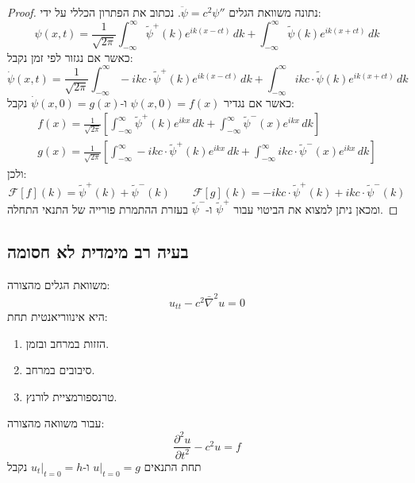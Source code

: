 \documentclass{tstextbook}
\begin{document}
\begin{proof}
נתונה משוואת הגלים \(\ddot{\psi}=c^{2}\psi''\). נכתוב את הפתרון הכללי על ידי:
$$\psi(x,t)=\frac{1}{\sqrt{ 2\pi }} \int_{-\infty}^{\infty} \tilde{\psi}^{+}(k) e^{ ik(x-ct) } \, dk + \int_{-\infty}^{\infty} \tilde{\psi}(k) e^{ ik(x+ct) }\, dk  $$
כאשר אם נגזור לפי זמן נקבל:
$$\dot{\psi}(x,t)=\frac{1}{\sqrt{ 2\pi }} \int_{-\infty}^{\infty} -ikc \cdot\tilde{\psi}^{+}(k) e^{ ik(x-ct) } \, dk + \int_{-\infty}^{\infty} ikc\cdot\tilde{\psi}(k) e^{ ik(x+ct) }\, dk  $$
כאשר אם נגדיר \(\psi(x,0)=f(x)\) ו-\(\dot{\psi}(x,0)=g(x)\) נקבל:
$$\begin{gather}f(x)=\frac{1}{\sqrt{ 2\pi }}\left[ \int_{-\infty}^{\infty} \tilde{\psi}^{+}(k)e^{ ikx } \, dk + \int_{-\infty}^{\infty} \tilde{\psi}^{-}(x)e^{ ikx } \, dk  \right]  \\g(x)=\frac{1}{\sqrt{ 2\pi }}\left[ \int_{-\infty}^{\infty} -ikc\cdot\tilde{\psi}^{+}(k)e^{ ikx } \, dk + \int_{-\infty}^{\infty} ikc\cdot \tilde{\psi}^{-}(x)e^{ ikx } \, dk  \right] 
\end{gather}$$
ולכן:
$$\mathcal{F} [f](k)= \tilde{\psi}^{+}(k)+\tilde{\psi}^{-}(k) \qquad \mathcal{F} [g] (k)=-ikc \cdot\tilde{\psi}^{+}(k) + ikc \cdot \tilde{\psi}^{-}(k)
$$
ומכאן ניתן למצוא את הביטוי עבור \(\tilde{\psi}^{+}\) ו-\(\tilde{\psi}^{-}\) בעזרת ההתמרת פורייה של התנאי התחלה.

\end{proof}
\subsection{בעיה רב מימדית לא חסומה}

\begin{proposition}
משוואת הגלים מהצורה:
$$u_{tt}-c^{2}\bar{\nabla}^2 u=0$$
היא אינווריאנטית תחת:

  \begin{enumerate}
    \item הזזות במרחב ובזמן. 


    \item סיבובים במרחב. 


    \item טרנספורמציית לורנץ. 


  \end{enumerate}
\end{proposition}
\begin{proposition}
עבור משוואה מהצורה:
$$\frac{\partial ^2u}{\partial t^{2}}-c^{2}u=f $$
תחת התנאים \(u|_{t=0}=g\) ו-\(u_{t}|_{t=0}=h\) נקבל

\end{proposition}
\end{document}
